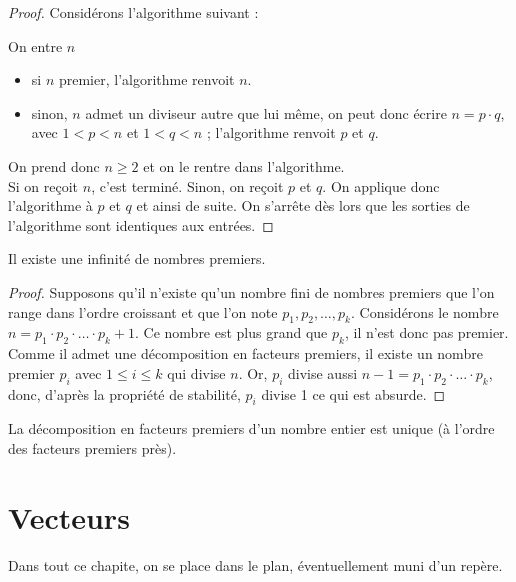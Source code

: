 \documentclass[a4paper, 12pt]{report}
\begin{document}
\begin{proof}
Considérons l'algorithme suivant :

\begin{algo}
On entre $n$
\begin{itemize}
\item si $n$ premier, l'algorithme renvoit $n$.
\item sinon, $n$ admet un diviseur autre que lui même, on peut donc écrire $n = p \cdot q$, avec $1 < p < n$ et $1 < q < n$ ;
l'algorithme renvoit $p$ et $q$.
\end{itemize}
\end{algo}

On prend donc $n \geq 2$ et on le rentre dans l'algorithme. \\
Si on reçoit $n$, c'est terminé. Sinon, on reçoit $p$ et $q$.
On applique donc l'algorithme à $p$ et $q$ et ainsi de suite. 
On s'arrête dès lors que les sorties de l'algorithme sont identiques aux entrées.
\end{proof}

\begin{thm}
Il existe une infinité de nombres premiers.
\end{thm}

\begin{proof}
Supposons qu'il n'existe qu'un nombre fini de nombres premiers que l'on range dans l'ordre croissant et que l'on note
 $p_1, p_2, \dots, p_k$. 
Considérons le nombre $n = p_1 \cdot p_2 \cdot \dots \cdot p_k + 1$. Ce nombre est plus grand que $p_k$, il n'est donc pas premier.
Comme il admet une décomposition en facteurs premiers, il existe un nombre premier $p_i$ avec $1 \leq i \leq k$ 
qui divise $n$. Or, $p_i$ divise aussi $n-1 = p_1 \cdot p_2 \cdot \dots \cdot p_k$, donc, d'après la propriété de stabilité,
$p_i$ divise 1 ce qui est absurde.
\end{proof}

\begin{thm}
	La décomposition en facteurs premiers d'un nombre entier est unique (à l'ordre des facteurs premiers près).
\end{thm}

\chapter{Vecteurs}

Dans tout ce chapite, on se place dans le plan, éventuellement muni d'un repère.
\end{document}
